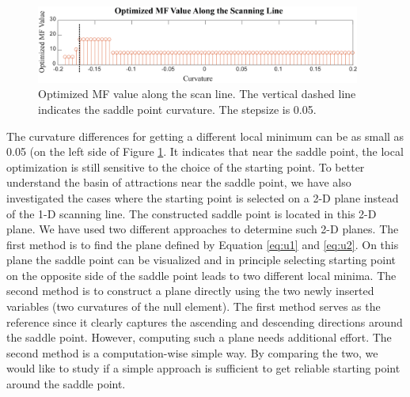 \begin{figure}[h!]
    \centering
    \includegraphics[width=0.95\textwidth]{chapter-4/figures/Scanning_Line_plot.png}
    \caption{Optimized MF value along the scan line. The vertical dashed line indicates the saddle point curvature. The stepsize is 0.05.}
    \label{fig: scanning_line}
\end{figure}

The curvature differences for getting a different local minimum can be as small as 0.05 (on the left side of Figure \ref{fig: scanning_line}. It indicates that near the saddle point, the local optimization is still sensitive to the choice of the starting point. To better understand the basin of attractions near the saddle point, we have also investigated the cases where the starting point is selected on a 2-D plane instead of the 1-D scanning line. The constructed saddle point is located in this 2-D plane. We have used two different approaches to determine such 2-D planes. The first method is to find the plane defined by Equation \ref{eq:u1} and \ref{eq:u2}. On this plane the saddle point can be visualized and in principle selecting starting point on the opposite side of the saddle point leads to two different local minima. The second method is to construct a plane directly using the two newly inserted variables (two curvatures of the null element). The first method serves as the reference since it clearly captures the ascending and descending directions around the saddle point. However, computing such a plane needs additional effort. The second method is a computation-wise simple way. By comparing the two, we would like to study if a simple approach is sufficient to get reliable starting point around the saddle point. 

